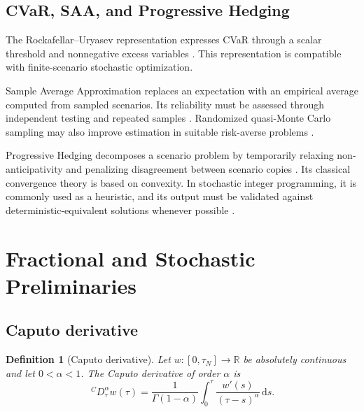 \documentclass[11pt,a4paper]{article}
\newtheorem{definition}{Definition}
\newcommand{\R}{\mathbb{R}}
\newcommand{\cD}{\,{}^{C}\!D}
\newcommand{\dd}{\,\mathrm{d}}
\begin{document}
\subsection{CVaR, SAA, and Progressive Hedging}

The Rockafellar--Uryasev representation expresses CVaR through a scalar
threshold and nonnegative excess variables
\citep{rockafellar2000,rockafellar2002cvar}. This representation is
compatible with finite-scenario stochastic optimization.

Sample Average Approximation replaces an expectation with an empirical
average computed from sampled scenarios. Its reliability must be
assessed through independent testing and repeated samples
\citep{kleywegt2002saa,shapiro2014}. Randomized quasi-Monte Carlo
sampling may also improve estimation in suitable risk-averse problems
\citep{melnikov2025rqmc}.

Progressive Hedging decomposes a scenario problem by temporarily
relaxing non-anticipativity and penalizing disagreement between scenario
copies \citep{rockafellar1991}. Its classical convergence theory is
based on convexity. In stochastic integer programming, it is commonly
used as a heuristic, and its output must be validated against
deterministic-equivalent solutions whenever possible
\citep{christiansen2023ph}.

\section{Fractional and Stochastic Preliminaries}
\label{sec:preliminaries}
\label{sec:preliminaries}

\subsection{Caputo derivative}

\begin{definition}[Caputo derivative]
Let \(w:[0,\tau_N]\rightarrow\R\) be absolutely continuous and let
\(0<\alpha<1\). The Caputo derivative of order \(\alpha\) is
\begin{equation}
  \cD_{\tau}^{\alpha}w(\tau)
  =
  \frac{1}{\Gamma(1-\alpha)}
  \int_{0}^{\tau}
  \frac{w'(s)}{(\tau-s)^{\alpha}}
  \dd s.
  \label{eq:caputo}
\end{equation}
\end{definition}
\end{document}
